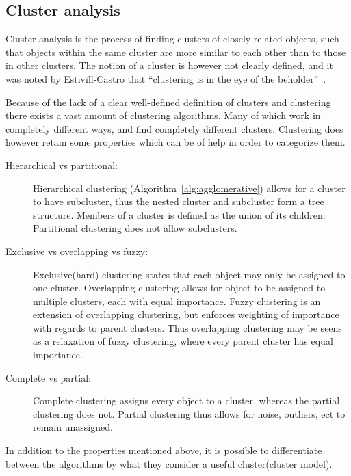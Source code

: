 \subsection{Cluster analysis}
Cluster analysis is the process of finding clusters of closely related objects, such that objects within the same cluster are more similar to each other than to those in other clusters. 
The notion of a cluster is however not clearly defined, and it was noted by Estivill-Castro that "`clustering is in the eye of the beholder"'~\cite{estivill2002so}.

\bigskip\noindent
Because of the lack of a clear well-defined definition of clusters and clustering there exists a vast amount of clustering algorithms. 
Many of which work in completely different ways, and find completely different clusters. 
Clustering does however retain some properties which can be of help in order to categorize them. 

\begin{description}
	\item[Hierarchical vs partitional:] Hierarchical clustering (Algorithm~\ref{alg:agglomerative}) allows for a cluster to have subcluster, thus the nested cluster and subcluster form a tree structure. Members of a cluster is defined as the union of its children. Partitional clustering does not allow subclusters. 
	\item[Exclusive vs overlapping vs fuzzy:] Exclusive(hard) clustering states that each object may only be assigned to one cluster. Overlapping clustering allows for object to be assigned to multiple clusters, each with equal importance. Fuzzy clustering is an extension of overlapping clustering, but enforces weighting of importance with regards to parent clusters. Thus overlapping clustering may be seens as a relaxation of fuzzy clustering, where every parent cluster has equal importance.
	\item[Complete vs partial:] Complete clustering assigns every object to a cluster, whereas the partial clustering does not. Partial clustering thus allows for noise, outliers, ect to remain unassigned.
\end{description}

\bigskip\noindent
In addition to the properties mentioned above, it is possible to 
differentiate between the algorithms by what they consider a useful cluster(cluster model). 


